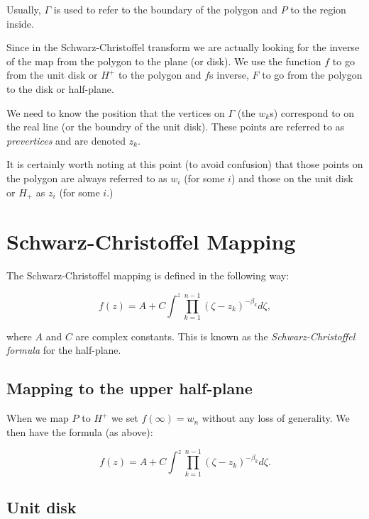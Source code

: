 \documentclass[a4paper,10pt]{amsart}
\newcommand{\sch}{Schwarz-Christoffel }
\begin{document}
Usually, $\Gamma$ is used to refer to the boundary of the polygon and $P$ to the region inside.


Since in the \sch transform we are actually looking for the inverse of the map from the polygon to the plane (or disk). We use the function $f$ to go from the unit disk or $H^+$ to the polygon and $f$s inverse, $F$ to go from the polygon to the disk or half-plane.  

We need to know the position that the vertices on $\Gamma$ (the $w_k$s) correspond to on the real line (or the boundry of the unit disk). These points are referred to as \emph{prevertices} and are denoted $z_k$.

It is certainly worth noting at this point (to avoid confusion) that those points on the polygon are always referred to as $w_i$ (for some $i$) and those on the unit disk or $H_+$ as $z_i$ (for some $i$.)



 
\section{\sch Mapping}

The \sch mapping is defined in the following way:


\begin{equation}
f(z) = A + C \int^z \prod_{k=1}^{n-1} (\zeta-z_k)^{-\beta_k} d\zeta,
\end{equation}

where $A$ and $C$ are complex constants. This is known as the \emph{\sch formula} for the half-plane.




\subsection{Mapping to the upper half-plane}

When we map $P$ to $H^+$ we set $f(\infty) = w_n$ without any loss of generality. We then have the formula (as above):

\begin{equation}
f(z) = A + C \int^z \prod_{k=1}^{n-1} (\zeta-z_k)^{-\beta_k} d\zeta.
\end{equation}



\subsection{Unit disk}
\end{document}
